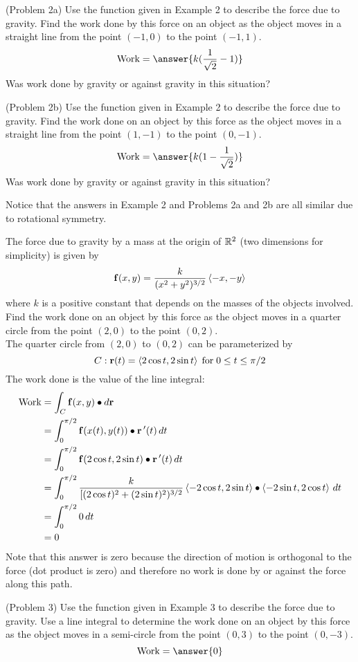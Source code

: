 \documentclass[handout]{ximera}
\begin{document}
\begin{problem}(Problem 2a)
Use the function given in Example 2 to describe the force due to gravity.
Find the work done by this force on an object as the object moves in a straight line from the point $(-1, 0)$ to the point $(-1,1)$.\\
\[
\text{Work} = \answer{k(\frac{1}{\sqrt 2} - 1)}
\]
Was work done by gravity or against gravity in this situation? 
\end{problem}

\begin{problem}(Problem 2b)
Use the function given in Example 2 to describe the force due to gravity.
Find the work done on an object by this force as the object moves in a straight line from the point $(1, -1)$ to the point $(0, -1)$.\\
\[
\text{Work} = \answer{k(1-\frac{1}{\sqrt 2})}
\]
Was work done by gravity or against gravity in this situation? 
\end{problem}

Notice that the answers in Example 2 and Problems 2a and 2b are all similar due to rotational symmetry.

\begin{example}[Example 3]
The force due to gravity by a mass at the origin of $\mathbb R^2$ (two dimensions for simplicity) is given by
\[
\mathbf f(x,y) = \frac{k}{(x^2 + y^2)^{3/2}} \left\langle -x, -y\right\rangle
\]
where $k$ is a positive constant that depends on the masses of the objects involved. Find the work done on an object
by this force as the object moves in a quarter circle from the point $(2, 0)$ to the point $(0, 2)$.\\
The quarter circle from $(2, 0)$ to $(0, 2)$ can be parameterized by
\[
C: \mathbf r(t) = \left\langle 2\cos t, 2\sin t\right\rangle \; \text{for}   \; 0 \leq t \leq \pi/2
\]
The work done is the value of the line integral:
\begin{align*}
\text{Work} &= \int_C \mathbf f(x,y) \bullet d\mathbf r\\
            &= \int_0^{\pi/2} \mathbf f(x(t),y(t)) \bullet \mathbf r\,'(t) \, dt\\
            &= \int_0^{\pi/2} \mathbf f(2\cos t, 2\sin t) \bullet \mathbf r\,'(t) \, dt\\
            &= \int_0^{\pi/2} \frac{k}{[(2\cos t)^2 + (2\sin t)^2)^{3/2}} \left\langle -2\cos t, 2 \sin t\right\rangle \bullet \left\langle -2\sin t, 2 \cos t\right\rangle \, dt\\
            &= \int_0^{\pi/2} 0 \, dt\\
            &= 0
\end{align*}
Note that this answer is zero because the direction of motion is orthogonal to the force (dot product is zero) and 
therefore no work is done by or against the force along this path.
\end{example}

\begin{problem}(Problem 3)
Use the function given in Example 3 to describe the force due to gravity.
Use a line integral to determine the work done on an object
by this force as the object moves in a semi-circle from the point $(0, 3)$ to the point $(0, -3)$.\\
\[
\text{Work} = \answer{0}
\]

\end{problem}
\end{document}
